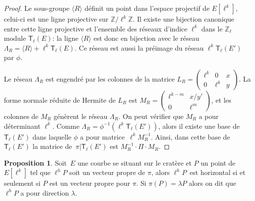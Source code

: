 \documentclass[10pt,a4paper]{book}
\theoremstyle{plain}
\theoremstyle{definition}
\theoremstyle{definition}
\theoremstyle{definition}
\newtheorem{prop}[thm]{Proposition}
\theoremstyle{definition}
\theoremstyle{remark}
\theoremstyle{remark}
\theoremstyle{definition}
\begin{document}
\begin{proof}
Le sous-groupe $\langle R \rangle$ définit un point dans l'espace projectif de $E[\ell^k]$,
celui-ci est une ligne projective sur $\mathbb{Z}/\ell^k \mathbb{Z}$. Il existe 
une bijection canonique~\cite[II.1.1]{Serre77} entre cette ligne projective et 
l'ensemble des réseaux d'indice $\ell^k$ dans le $\mathbb{Z}_{\ell}$ module $\mathsf{T}_{\ell}(E)$:
la ligne $\langle R \rangle$ est donc en bijection avec le réseau~$\Lambda_R = 
\langle R \rangle + \ell^k \mathsf{T}_{\ell}(E)$. Ce réseau est aussi la préimage du réseau 
$\ell^k\mathsf{T}_{\ell}(E')$ par $\phi$.

Le réseau $\Lambda_R$ est engendré par les colonnes de la matrice 
$L_R = \left (\begin{smallmatrix}\ell^k & 0 & x\\0 & \ell^k & y\end{smallmatrix} \right )$.
La forme normale réduite de Hermite de $L_R$ est 
$M_R = \left (\begin{smallmatrix}\ell^{k-m} & x/y' \\ 0 & \ell^m\end{smallmatrix}\right )$,
et les colonnes de $M_R$ génèrent le réseau $\Lambda_R$.
On peut vérifier que $M_R$ a pour déterminant $\ell^k$.
Comme $\Lambda_R = \phi^{-1} (\ell^k \mathsf{T}_{\ell} (E'))$,
alors il existe une base de~$\mathsf{T}_{\ell}(E')$
dans laquelle $\phi$ a pour matrice~$\ell^k M_R^{-1}$.
Ainsi, dans cette base de ~$\mathsf{T}_{\ell}(E')$
la matrice de~$\pi|\mathsf{T}_{\ell}(E')$ est $M_R^{-1} \cdot \Pi \cdot M_R^{}$.
\end{proof}


\begin{prop} \label{pro:dia:hor}
Soit~$E$ une courbe se situant sur le cratère et $P$ un point de $E[\ell^k]$
tel que $\ell^h P$ soit un vecteur propre de $\pi$, 
alors $\ell^hP$~est horizontal si et seulement si $P$ est un vecteur propre pour $\pi$.
Si $\pi(P)=\lambda P$ alors on dit que $\ell^h P$ a pour direction $\lambda$.
\end{prop}
\end{document}
